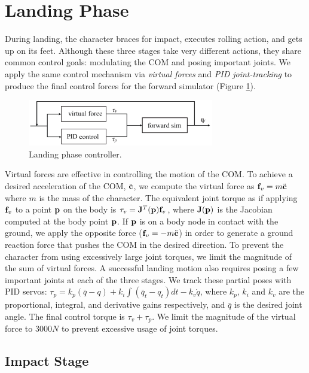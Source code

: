 \section{Landing Phase}
\label{sec:landing_landing}
During landing, the character braces for impact, executes rolling
action, and gets up on its feet. Although these three stages take very
different actions, they share common control goals: modulating the COM
and posing important joints.  We apply the same control mechanism via
\emph{virtual forces} and \emph{PID joint-tracking} to produce the
final control forces for the forward simulator (Figure
\ref{fig:landing_landingOverview}).

\begin{figure}[htbp]
\center
  \includegraphics[width=3.2in]{images/landingOverview}
  \caption{Landing phase controller.}
 \label{fig:landing_landingOverview}
\end{figure}

Virtual forces are effective in controlling the motion of the COM. To
achieve a desired acceleration of the COM, $\ddot{\mathbf{c}}$, we compute
the virtual force as $\mathbf{f}_v = m \ddot{\mathbf{c}}$ where $m$ is the mass of the
character. The equivalent joint torque as if applying $\mathbf{f}_v$ to a
point $\mathbf{p}$ on the body is $\tau_v = \mathbf{J}^T (\mathbf{p}) \mathbf{f}_v$,
where $\mathbf{J}(\mathbf{p})$ is the Jacobian computed at the body point
$\mathbf{p}$.
If $\mathbf{p}$ is on a body node in contact with the ground, 
we apply the opposite force ($\mathbf{f}_v = -m \ddot{\mathbf{c}}$) in order to
generate a ground reaction force that pushes the COM in the desired direction.
To prevent the character from using excessively large joint
torques, we limit the magnitude of the sum of virtual forces.  A
successful landing motion also requires posing a few important joints
at each of the three stages. We track these partial poses with PID
servos: $\tau_p = k_p (\bar{q} - q) + k_i \int (\bar{q}_t - q_t) dt -
k_v \dot{q}$, where $k_p$, $k_i$ and $k_v$ are the proportional,
integral, and derivative gains respectively, and $\bar{q}$ is the
desired joint angle.  The final control torque is $\tau_v+\tau_p$.
We limit the magnitude of the virtual force to $3000N$ to prevent
excessive usage of joint torques.



\subsection{Impact Stage}
\label{sec:landing_impact}


